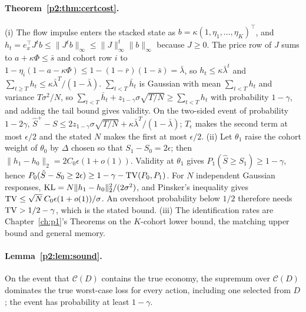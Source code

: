 \paragraph{Theorem~\ref{p2:thm:certcost}.} (i) The flow impulse enters the stacked state as $b=\kappa(1,\eta_1,\ldots,\eta_K)^\top$, and $h_t=e_x^\top J^tb\le\|J^tb\|_\infty\le\|J\|_\infty^t\|b\|_\infty$ because $J\ge0$. The price row of $J$ sums to $a+\kappa\Phi\le\bar s$ and cohort row $i$ to $1-\eta_i(1-a-\kappa\Phi)\le1-(1-\bar r)(1-\bar s)=\bar\lambda$, so $h_t\le\kappa\bar\lambda^t$ and $\sum_{t\ge T}h_t\le\kappa\bar\lambda^T/(1-\bar\lambda)$. $\sum_{t<T}\bar h_t$ is Gaussian with mean $\sum_{t<T}h_t$ and variance $T\sigma^2/N$, so $\sum_{t<T}\bar h_t+z_{1-\gamma}\sigma\sqrt{T/N}\ge\sum_{t<T}h_t$ with probability $1-\gamma$, and adding the tail bound gives validity. On the two-sided event of probability $1-2\gamma$, $\hat S^+-S\le2z_{1-\gamma}\sigma\sqrt{T/N}+\kappa\bar\lambda^T/(1-\bar\lambda)$; $T_\epsilon$ makes the second term at most $\epsilon/2$ and the stated $N$ makes the first at most $\epsilon/2$. (ii) Let $\theta_1$ raise the cohort weight of $\theta_0$ by $\Delta$ chosen so that $S_1-S_0=2\epsilon$; then $\|h_1-h_0\|_2=2C_0\epsilon(1+o(1))$. Validity at $\theta_1$ gives $P_1(\hat S\ge S_1)\ge1-\gamma$, hence $P_0(\hat S-S_0\ge2\epsilon)\ge1-\gamma-{\rm TV}(P_0,P_1)$. For $N$ independent Gaussian responses, ${\rm KL}=N\|h_1-h_0\|_2^2/(2\sigma^2)$, and Pinsker's inequality gives ${\rm TV}\le\sqrt N\,C_0\epsilon(1+o(1))/\sigma$. An overshoot probability below $1/2$ therefore needs ${\rm TV}>1/2-\gamma$, which is the stated bound. (iii) The identification rates are Chapter~\ref{ch:p1}'s Theorems on the $K$-cohort lower bound, the matching upper bound and general memory.

\paragraph{Lemma~\ref{p2:lem:sound}.} On the event that $\mathcal C(D)$ contains the true economy, the supremum over $\mathcal C(D)$ dominates the true worst-case loss for every action, including one selected from $D$; the event has probability at least $1-\gamma$.


